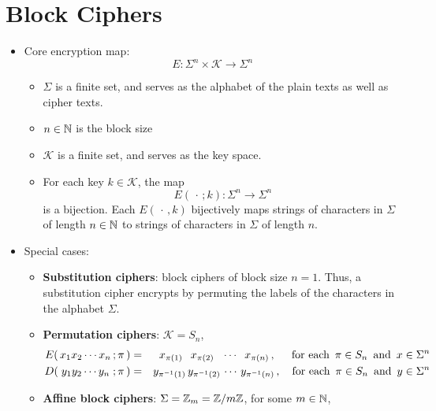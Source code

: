 
\section{Block Ciphers}
\setcounter{theorem}{0}
\setcounter{equation}{0}

\begin{itemize}
\item
	Core encryption map:
	\begin{equation*}
	E : \Sigma^{n} \times \mathcal{K} \longrightarrow \Sigma^{n}\,
	\end{equation*}
	\begin{itemize}
	\item
		$\Sigma$ is a finite set, and serves as the alphabet of the plain texts as well as cipher texts.
	\item
		$n \in \mathbb{N}$ is the block size
	\item
		$\mathcal{K}$ is a finite set, and serves as the key space.
	\item
		For each key $k \in \mathcal{K}$, the map
		\begin{equation*}
		E(\,\cdot\,;k) : \Sigma^{n} \longrightarrow \Sigma^{n}
		\end{equation*}
		is a bijection.
		Each $E(\,\cdot\,,k)$ bijectively maps strings of characters in $\Sigma$ of length $n \in \mathbb{N}$
		to strings of characters in $\Sigma$ of length $n$.
	\end{itemize}
\item
	Special cases:
	\begin{itemize}
	\item
		\textbf{Substitution ciphers}: block ciphers of block size $n = 1$.
		Thus, a substitution cipher encrypts by permuting the labels of the characters in the alphabet $\Sigma$.
	\item
		\textbf{Permutation ciphers}: $\mathcal{K} = S_{n}$,
		\begin{eqnarray*}
		E\!\left(\,x_{1}x_{2} \cdots x_{n}\,;\pi\,\right)
		& = &
			\;\; x_{\pi(1)} \;\;\, x_{\pi(2)} \;\;\, \cdots \;\; x_{\pi(n)} \,,
		\quad\;\,
		\textnormal{for each \,$\pi \in S_{n}$\, and \,$x \in \Sigma^{n}$}
		\\
		D\!\left(\;y_{1}y_{2} \cdots y_{n}\;;\pi\,\right)
		& = &
			y_{\pi^{-1}(1)}\,y_{\pi^{-1}(2)} \, \cdots \, y_{\pi^{-1}(n)}\,,
		\quad
		\textnormal{for each \,$\pi \in S_{n}$\, and \,$y \in \Sigma^{n}$}
		\end{eqnarray*}
	\item
		\textbf{Affine block ciphers}: $\Sigma = \mathbb{Z}_{m} = \mathbb{Z} / m\mathbb{Z}$, for some $m \in \mathbb{N}$,

\end{itemize}
\end{itemize}
